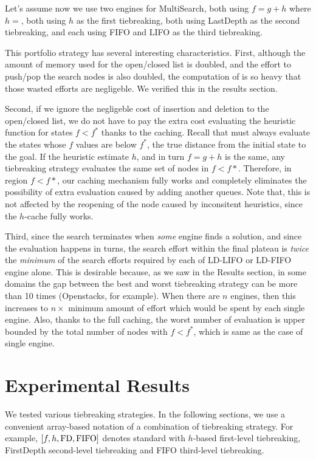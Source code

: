 Let's assume now we use two \astar engines for MultiSearch, both using
$f=g+h$ where $h=$\lmcut, both using $h$ as the first tiebreaking, both
using LastDepth as the second tiebreaking, and each using FIFO and LIFO
as the third tiebreaking.

This portfolio strategy has several interesting characteristics.  First,
although the amount of memory used for the open/closed list is doubled,
and the effort to push/pop the search nodes is also doubled, the
computation of \lmcut is so heavy that those wasted efforts are
negligeble.  We verified this in the results section.

Second, if we ignore the negligeble cost of insertion and deletion to the open/closed list, we do not have to pay the extra cost evaluating the heuristic function for states $f<f^*$ thanks to the caching.
Recall that \astar must always evaluate the states whose $f$ values are below $f^*$, the true distance from the initial state to the goal. If the heuristic estimate $h$, and in turn $f=g+h$ is the same, any tiebreaking strategy evaluates the same set of nodes in $f<f*$.
Therefore, in region $f<f*$, our caching mechanism fully works and completely eliminates the possibility of extra evaluation caused by adding another queues.
Note that, this is not affected by the reopening of the node caused by
inconsitent heuristics, since the $h$-cache fully works.

Third, since the search terminates when \emph{some} engine finds a
solution, and since the evaluation happens in turns, the search effort
within the final plateau is \emph{twice} the \emph{minimum} of the
search efforts required by each of LD-LIFO or LD-FIFO engine alone. This
is desirable because, as we saw in the Results section, in some domains the
gap between the best and worst tiebreaking strategy can be more than 10
times (Openstacks, for example).  When there are $n$ engines, then this
increases to $n\times$ minimum amount of effort which would be spent by
each single engine.
Also, thanks to the full caching, the worst number of evaluation is
upper bounded by the total number of nodes with $f<f^*$, which is same
as the case of single engine.

\section{Experimental Results}


We tested various tiebreaking strategies. In the following sections, we
use a convenient array-based notation of a combination of tiebreaking
strategy.  For example, $[f,h,\mbox{FD},\mbox{FIFO}]$ denotes standard \astar with
$h$-based first-level tiebreaking, FirstDepth second-level tiebreaking and FIFO
third-level tiebreaking.

